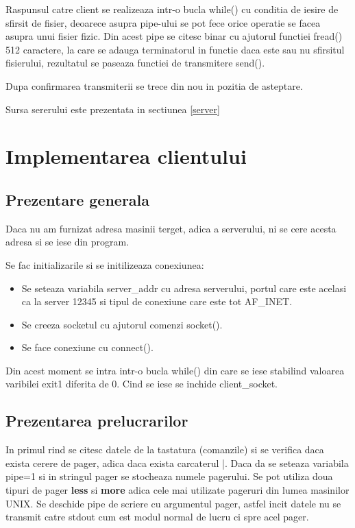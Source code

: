 Raspunsul catre client se realizeaza intr-o bucla while() cu conditia de
iesire de sfirsit de fisier, deoarece asupra pipe-ului se pot fece orice
operatie se facea asupra unui fisier fizic. Din acest pipe se citesc binar
cu ajutorul functiei fread() 512 caractere, la care se adauga terminatorul
in functie daca este sau nu sfirsitul fisierului, rezultatul se paseaza
functiei de transmitere send().

Dupa confirmarea transmiterii se trece din nou in pozitia de asteptare.

Sursa sererului este prezentata in sectiunea \ref{server}

\section{Implementarea clientului}

\subsection{Prezentare generala}

\hspace{5mm}Daca nu am furnizat adresa masinii terget, adica a serverului,
ni se cere acesta adresa si se iese din program.

Se fac initializarile si se initilizeaza conexiunea:
\begin{itemize}
\item Se seteaza variabila server\_addr cu adresa serverului, portul care
este acelasi ca la server 12345 si tipul de conexiune care este tot
AF\_INET.
\item Se creeza socketul cu ajutorul comenzi socket().
\item Se face conexiune cu connect().
\end{itemize}

Din acest moment se intra intr-o bucla while() din care se iese stabilind
valoarea varibilei exit1 diferita de 0. Cind se iese se inchide
client\_socket.
\subsection{Prezentarea prelucrarilor}

\hspace{5mm}In primul rind se citesc datele de la tastatura (comanzile) si
se verifica daca exista cerere de pager, adica daca exista carcaterul |.
Daca da se seteaza variabila pipe=1 si in stringul pager se stocheaza numele
pagerului. Se pot utiliza doua tipuri de pager {\bf less} si {\bf more}
adica cele mai utilizate pageruri din lumea masinilor UNIX. Se deschide pipe
de scriere cu argumentul pager, astfel incit datele nu se transmit catre
stdout cum est modul normal de lucru ci spre acel pager.


